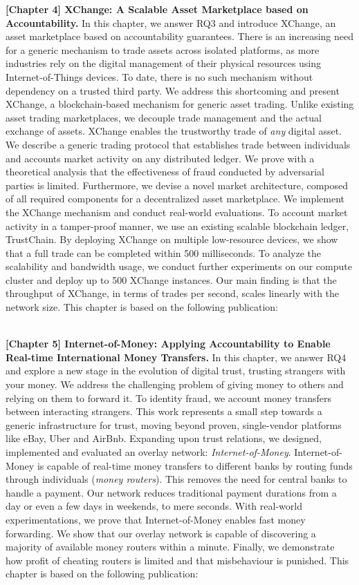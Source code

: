 \textbf{[Chapter 4] XChange: A Scalable Asset Marketplace based on Accountability.}
In this chapter, we answer RQ3 and introduce XChange, an asset marketplace based on accountability guarantees.
There is an increasing need for a generic mechanism to trade assets across isolated platforms, as more industries rely on the digital management of their physical resources using Internet-of-Things devices.
To date, there is no such mechanism without dependency on a trusted third party.
We address this shortcoming and present XChange, a blockchain-based mechanism for generic asset trading.
Unlike existing asset trading marketplaces, we decouple trade management and the actual exchange of assets.
XChange enables the trustworthy trade of \emph{any} digital asset.
We describe a generic trading protocol that establishes trade between individuals and accounts market activity on any distributed ledger.
We prove with a theoretical analysis that the effectiveness of fraud conducted by adversarial parties is limited.
Furthermore, we devise a novel market architecture, composed of all required components for a decentralized asset marketplace.
We implement the XChange mechanism and conduct real-world evaluations.
To account market activity in a tamper-proof manner, we use an existing scalable blockchain ledger, TrustChain.
By deploying XChange on multiple low-resource devices, we show that a full trade can be completed within 500 milliseconds.
To analyze the scalability and bandwidth usage, we conduct further experiments on our compute cluster and deploy up to 500 XChange instances.
Our main finding is that the throughput of XChange, in terms of trades per second, scales linearly with the network size.
This chapter is based on the following publication:

\\

\textbf{[Chapter 5] Internet-of-Money: Applying Accountability to Enable Real-time International Money Transfers.}
In this chapter, we answer RQ4 and explore a new stage in the evolution of digital trust, trusting strangers with your money.
We address the challenging problem of giving money to others and relying on them to forward it.
To identity fraud, we account money transfers between interacting strangers.
This work represents a small step towards a generic infrastructure for trust, moving beyond proven, single-vendor platforms like eBay, Uber and AirBnb.
Expanding upon trust relations, we designed, implemented and evaluated an overlay network: \emph{Internet-of-Money}.
Internet-of-Money is capable of real-time money transfers to different banks by routing funds through individuals (\emph{money routers}).
This removes the need for central banks to handle a payment.
Our network reduces traditional payment durations from a day or even a few days in weekends, to mere seconds.
With real-world experimentations, we prove that Internet-of-Money enables fast money forwarding.
We show that our overlay network is capable of discovering a majority of available money routers within a minute.
Finally, we demonstrate how profit of cheating routers is limited and that misbehaviour is punished.
This chapter is based on the following publication:

